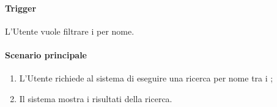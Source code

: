 \paragraph*{Trigger}
L'Utente vuole filtrare i  per nome.

\paragraph*{Scenario principale}
\begin{enumerate}
  \item L'Utente richiede al sistema di eseguire una ricerca per nome tra i ;
  \item Il sistema mostra i risultati della ricerca.
\end{enumerate}
